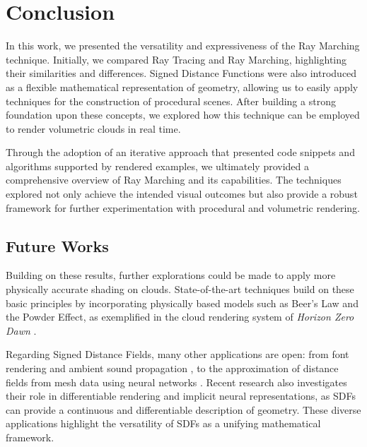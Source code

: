\chapter{Conclusion}\label{chp:LABEL_CHP_6}

In this work, we presented the versatility and expressiveness of the Ray Marching technique. Initially, we compared Ray Tracing and Ray Marching, highlighting their similarities and differences. Signed Distance Functions were also introduced as a flexible mathematical representation of geometry, allowing us to easily apply techniques for the construction of procedural scenes. After building a strong foundation upon these concepts, we explored how this technique can be employed to render volumetric clouds in real time. 

Through the adoption of an iterative approach that presented code snippets and algorithms supported by rendered examples, we ultimately provided a comprehensive overview of Ray Marching and its capabilities. The techniques explored not only achieve the intended visual outcomes but also provide a 
robust framework for further experimentation with procedural and volumetric rendering. 

\section{Future Works}

Building on these results, further explorations could be made to apply more physically accurate shading on clouds. State-of-the-art techniques build on these basic 
principles by incorporating physically based models such as Beer’s Law and the Powder 
Effect, as exemplified in the cloud rendering system of \textit{Horizon Zero Dawn} 
\cite{Schneider2015Cloudscapes}.

Regarding Signed Distance Fields, many other applications are open: from font rendering 
\cite{green2007siggraph} and ambient sound propagation \cite{Mizdal2019AmbientSound}, to the 
approximation of distance fields from mesh data using neural networks 
\cite{park2019deepsdf}. Recent research also investigates their role in differentiable 
rendering \cite{nimier2020differentiable} and implicit neural representations, as SDFs can
provide a continuous and differentiable description of geometry. These diverse 
applications highlight the versatility of SDFs as a unifying mathematical framework.

